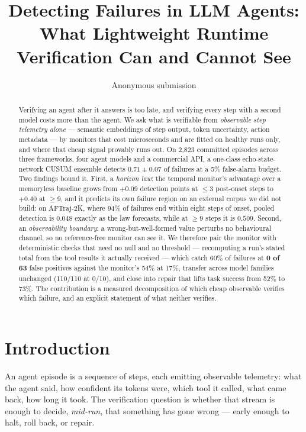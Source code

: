 \documentclass{article}
\title{Detecting Failures in LLM Agents:\\
       What Lightweight Runtime Verification Can and Cannot See}
\author{Anonymous submission}
\begin{document}
\maketitle

\begin{abstract}
Verifying an agent after it answers is too late, and verifying every step with
a second model costs more than the agent. We ask what is verifiable from
\emph{observable step telemetry alone} --- semantic embeddings of step output,
token uncertainty, action metadata --- by monitors that cost microseconds and
are fitted on healthy runs only, and where that cheap signal provably runs out.
On 2{,}823 committed episodes across three frameworks, four agent models and a
commercial API, a one-class echo-state-network CUSUM ensemble detects
$0.71\pm0.07$ of failures at a 5\% false-alarm budget. Two findings bound it.
First, a \emph{horizon law}: the temporal monitor's advantage over a memoryless
baseline grows from $+0.09$ detection points at $\le3$ post-onset steps to
$+0.40$ at $\ge9$, and it predicts its own failure region on an external corpus
we did not build: on AFTraj-2K, where 94\% of failures end within eight steps of
onset, pooled detection is $0.048$ exactly as the law forecasts, while at $\ge9$
steps it is $0.509$. Second, an \emph{observability boundary}:
a wrong-but-well-formed value perturbs no behavioural channel, so no
reference-free monitor can see it. We therefore pair the monitor with
deterministic checks that need no null and no threshold --- recomputing a run's
stated total from the tool results it actually received --- which catch 60\% of
failures at \textbf{0 of 63} false positives against the monitor's 54\% at 17\%,
transfer across model families unchanged (110/110 at 0/10), and close into
repair that lifts task success from 52\% to 73\%. The contribution is a
measured decomposition of which cheap observable verifies which failure, and
an explicit statement of what neither verifies.
\end{abstract}

\section{Introduction}

An agent episode is a sequence of steps, each emitting observable telemetry:
what the agent said, how confident its tokens were, which tool it called, what
came back, how long it took. The verification question is whether that stream
is enough to decide, \emph{mid-run}, that something has gone wrong --- early
enough to halt, roll back, or repair.
\end{document}
